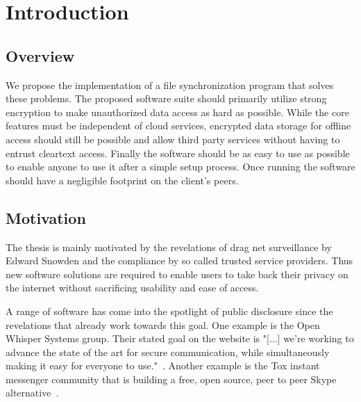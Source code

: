 \chapter{Introduction}
\label{chap:intro}


\section{Overview}

We propose the implementation of a file synchronization program that solves these problems.
The proposed software suite should primarily utilize strong encryption to make unauthorized data access as hard as possible.
While the core features must be independent of cloud services, encrypted data storage for offline access should still be possible and allow third party services without having to entrust cleartext access.
Finally the software should be as easy to use as possible to enable anyone to use it after a simple setup process.
Once running the software should have a negligible footprint on the client's peers.

\section{Motivation}

The thesis is mainly motivated by the revelations of drag net surveillance by Edward Snowden and the compliance by so called trusted service providers.
Thus new software solutions are required to enable users to take back their privacy on the internet without sacrificing usability and ease of access.

A range of software has come into the spotlight of public disclosure since the revelations that already work towards this goal.
One example is the Open Whisper Systems group.
Their stated goal on the website is "[...] we're working to advance the state of the art for secure communication, while simultaneously making it easy for everyone to use."~\cite{web:site:whispersystems:about}.
Another example is the Tox instant messenger community that is building a free, open source, peer to peer Skype alternative~\cite{web:site:tox}.


